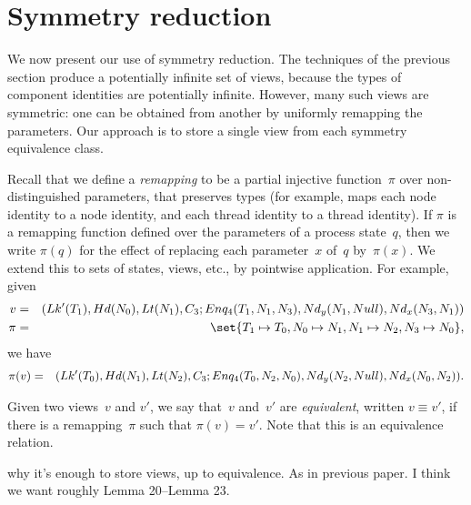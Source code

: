 \section{Symmetry reduction}
\label{sec:symmetry}

We now present our use of symmetry reduction.  The techniques of the previous
section produce a potentially infinite set of views, because the types of
component identities are potentially infinite.  However, many such views are
symmetric: one can be obtained from another by uniformly remapping the
parameters.  Our approach is to store a single view from each symmetry
equivalence class.   


Recall that we define a \emph{remapping} to be a partial injective
function~$\pi$ over non-distinguished parameters, that preserves types (for
example, maps each node identity to a node identity, and each thread identity
to a thread identity).  
%
If $\pi$ is a remapping function defined over the parameters of a process
state~$q$, then we write $\pi(q)$ for the effect of replacing each
parameter~$x$ of~$q$ by~$\pi(x)$.  We extend this to sets of states, views,
etc., by pointwise application.  For example, given
%
\begin{eqnarray*}
v & = & 
  \begin{align}
  (\Lock'(T_1), \Head(N_0), \Last(N_1), \Con_3; 
    Enq_4(T_1, N_1, N_3), \Node_y(N_1, Null),\Node_x(N_3, N_1))
  \end{align} \\
\pi & = & 
  \set{ T_1 \mapsto T_0, N_0 \mapsto N_1, N_1 \mapsto N_2, N_3 \mapsto N_0 },
\end{eqnarray*}
%
we have 
\begin{eqnarray*}
\pi(v) & = & 
  \begin{align}
  (Lk'(T_0), Hd(N_1), Lt(N_2), C_3; 
   Enq_4(T_0, N_2, N_0), Nd_y(N_2, Null),Nd_x(N_0, N_2)) .
  \end{align}
\end{eqnarray*}


\begin{definition}
Given two views~$v$ and $v'$, we say that~$v$ and~$v'$ are \emph{equivalent},
written $v \equiv v'$, if there is a remapping~$\pi$ such that $\pi(v) = v'$.
Note that this is an equivalence relation.
\end{definition}


 why it's enough to store views, up to equivalence.  As in
previous paper.  I think we want roughly Lemma 20--Lemma 23.




